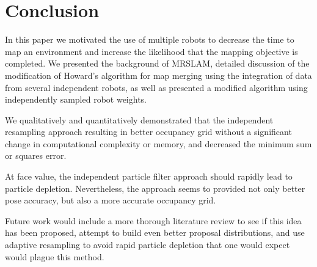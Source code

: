 \section{Conclusion}
\label{S:Conc}


In this paper we motivated the use of multiple robots to decrease the time to map an environment and increase the likelihood that the mapping objective is completed.  We presented the background of MRSLAM, detailed discussion of the modification of Howard's algorithm \cite{howard2006multi} for map merging using the integration of data from several independent robots, as well as presented a modified algorithm using independently sampled robot weights.

We qualitatively and quantitatively demonstrated that the independent resampling approach resulting in better occupancy grid without a significant change in computational complexity or memory, and decreased the minimum sum or squares error.  

At face value, the independent particle filter approach should rapidly lead to particle depletion.  Nevertheless, the approach seems to provided not only better pose accuracy, but also a more accurate occupancy grid.

Future work would include a more thorough literature review to see if this idea has been proposed, attempt to build even better proposal distributions, and use adaptive resampling to avoid rapid particle depletion \citep{Grisetti2007} that one would expect would plague this method.